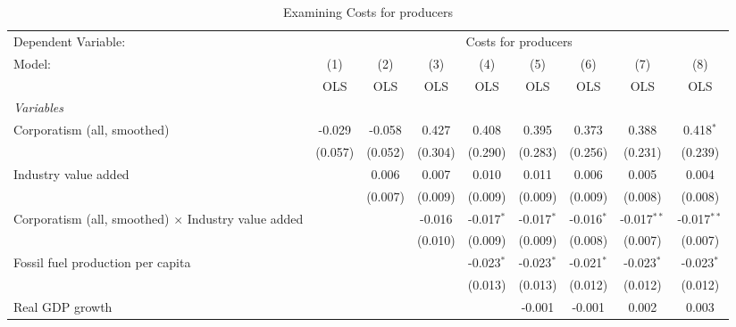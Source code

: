 
\begin{table}[htbp]
   \caption{Examining Costs for producers}
   \centering
   \begin{tabular}{lcccccccc}
      \toprule
      Dependent Variable: & \multicolumn{8}{c}{Costs for producers}\\
      Model:                                                     & (1)     & (2)     & (3)     & (4)          & (5)          & (6)          & (7)           & (8)\\  
                                                                 &  OLS    & OLS     & OLS     & OLS          & OLS          & OLS          & OLS           & OLS\\  
      \midrule
      \emph{Variables}\\
      Corporatism (all, smoothed)                                & -0.029  & -0.058  & 0.427   & 0.408        & 0.395        & 0.373        & 0.388         & 0.418$^{*}$\\   
                                                                 & (0.057) & (0.052) & (0.304) & (0.290)      & (0.283)      & (0.256)      & (0.231)       & (0.239)\\   
      Industry value added                                       &         & 0.006   & 0.007   & 0.010        & 0.011        & 0.006        & 0.005         & 0.004\\   
                                                                 &         & (0.007) & (0.009) & (0.009)      & (0.009)      & (0.009)      & (0.008)       & (0.008)\\   
      Corporatism (all, smoothed) $\times$ Industry value added  &         &         & -0.016  & -0.017$^{*}$ & -0.017$^{*}$ & -0.016$^{*}$ & -0.017$^{**}$ & -0.017$^{**}$\\   
                                                                 &         &         & (0.010) & (0.009)      & (0.009)      & (0.008)      & (0.007)       & (0.007)\\   
      Fossil fuel production per capita                          &         &         &         & -0.023$^{*}$ & -0.023$^{*}$ & -0.021$^{*}$ & -0.023$^{*}$  & -0.023$^{*}$\\   
                                                                 &         &         &         & (0.013)      & (0.013)      & (0.012)      & (0.012)       & (0.012)\\   
      Real GDP growth                                            &         &         &         &              & -0.001       & -0.001       & 0.002         & 0.003\\   

\end{tabular}
\end{table}
